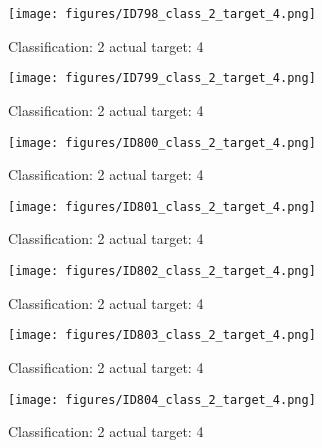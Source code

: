 \begin{figure}[h!]
\begin{center}
\texttt{[image: figures/ID798\_class\_2\_target\_4.png]}
\end{center}
\caption{ Classification: 2 actual target: 4}
\label{fig:ID798_class_2_target_4}
\end{figure}
\begin{figure}[h!]
\begin{center}
\texttt{[image: figures/ID799\_class\_2\_target\_4.png]}
\end{center}
\caption{ Classification: 2 actual target: 4}
\label{fig:ID799_class_2_target_4}
\end{figure}
\begin{figure}[h!]
\begin{center}
\texttt{[image: figures/ID800\_class\_2\_target\_4.png]}
\end{center}
\caption{ Classification: 2 actual target: 4}
\label{fig:ID800_class_2_target_4}
\end{figure}
\begin{figure}[h!]
\begin{center}
\texttt{[image: figures/ID801\_class\_2\_target\_4.png]}
\end{center}
\caption{ Classification: 2 actual target: 4}
\label{fig:ID801_class_2_target_4}
\end{figure}
\begin{figure}[h!]
\begin{center}
\texttt{[image: figures/ID802\_class\_2\_target\_4.png]}
\end{center}
\caption{ Classification: 2 actual target: 4}
\label{fig:ID802_class_2_target_4}
\end{figure}
\begin{figure}[h!]
\begin{center}
\texttt{[image: figures/ID803\_class\_2\_target\_4.png]}
\end{center}
\caption{ Classification: 2 actual target: 4}
\label{fig:ID803_class_2_target_4}
\end{figure}
\begin{figure}[h!]
\begin{center}
\texttt{[image: figures/ID804\_class\_2\_target\_4.png]}
\end{center}
\caption{ Classification: 2 actual target: 4}
\label{fig:ID804_class_2_target_4}
\end{figure}
